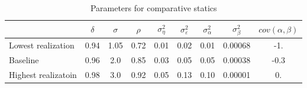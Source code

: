\begin{table}
\begin{tabular}{l|cccccccc}
                  & $\delta$ & $\sigma$ & $\rho$ & $\sigma^2_{\eta}$ & $\sigma^2_{\varepsilon}$ & $\sigma^2_{\alpha}$ & $\sigma^2_{\beta}$ & $cov(\alpha,\beta)$ \\
                \hline
Lowest realization  &  0.94  &  1.05  & 0.72   &    0.01           &    0.02                  &     0.01            &      0.00068       &    -1.     \\
Baseline            &  0.96  &  2.0   & 0.85   &    0.03           &    0.05                  &     0.05            &      0.00038       &    -0.3    \\
Highest realizatoin &  0.98  &  3.0   & 0.92   &    0.05           &    0.13                  &     0.10            &      0.00001       &     0.     \\
\end{tabular}
\caption{Parameters for comparative statics}
\label{tab:comp_stat_parameters}
\end{table}

